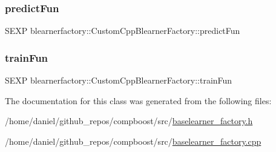 \subsubsection{\texorpdfstring{predict\+Fun}{predictFun}}
{\footnotesize\ttfamily S\+E\+XP blearnerfactory\+::\+Custom\+Cpp\+Blearner\+Factory\+::predict\+Fun\hspace{0.3cm}{\ttfamily [private]}}

\mbox{\label{classblearnerfactory_1_1_custom_cpp_blearner_factory_aad89a4d126b8b3e5ac0b6bca98074193}} 
\subsubsection{\texorpdfstring{train\+Fun}{trainFun}}
{\footnotesize\ttfamily S\+E\+XP blearnerfactory\+::\+Custom\+Cpp\+Blearner\+Factory\+::train\+Fun\hspace{0.3cm}{\ttfamily [private]}}



The documentation for this class was generated from the following files\+:\begin{DoxyCompactItemize}
\item 
/home/daniel/github\+\_\+repos/compboost/src/\hyperlink{baselearner__factory_8h}{baselearner\+\_\+factory.\+h}\item 
/home/daniel/github\+\_\+repos/compboost/src/\hyperlink{baselearner__factory_8cpp}{baselearner\+\_\+factory.\+cpp}\end{DoxyCompactItemize}
